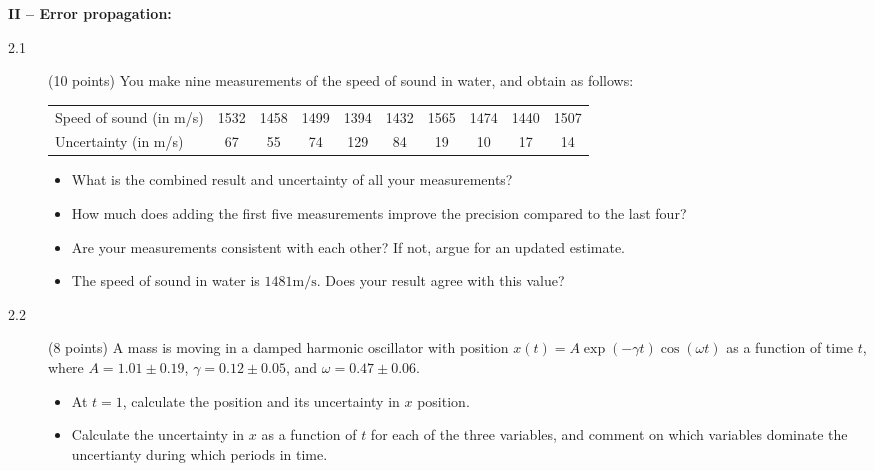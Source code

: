 \documentclass[11pt]{article}
\begin{document}
\vspace{2ex}
\noindent
{\bf II -- Error propagation:}
\vspace*{-1ex}
\begin{description}
\item[2.1] (10 points)
  You make nine measurements of the speed of sound in water, and obtain as follows:
  \vspace*{-2ex}
  \begin{center}
  \begin{tabular}{lccccccccc}
    \hline
    Speed of sound (in m/s)       &1532    &1458    &1499    &1394    &1432    &1565    &1474    &1440    &1507\\
    Uncertainty (in m/s)          &67      &55      &74      &129     &84      &19      &10      &17      &14\\
    \hline
  \end{tabular}
  \end{center}
  \vspace*{-3ex}
  \begin{itemize}
    \item What is the combined result and uncertainty of all your measurements?
    \item How much does adding the first five measurements improve the precision compared to the last four?
    \item Are your measurements consistent with each other? If not, argue for an updated estimate.
    \item The speed of sound in water is $1481 \mbox{m/s}$. Does your result agree with this value?
  \end{itemize}
%
\item[2.2] (8 points)
  A mass is moving in a damped harmonic oscillator with position $x(t) = A \exp(-\gamma t) \cos(\omega t)$
  as a function of time $t$, where $A = 1.01 \pm 0.19$, $\gamma = 0.12 \pm 0.05$, and $\omega = 0.47 \pm 0.06$.
  \vspace*{-1ex}
  \begin{itemize}
    \item At $t = 1$, calculate the position and its uncertainty in $x$ position.
    \item Calculate the uncertainty in $x$ as a function of $t$ for each of the three variables, and comment on
      which variables dominate the uncertianty during which periods in time.
  \end{itemize}
\end{description}
\end{document}
